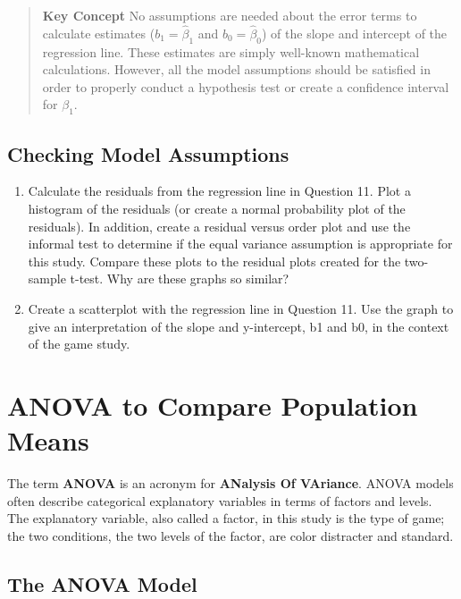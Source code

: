 \documentclass[
]{report}
\begin{document}
\begin{quote}
\textbf{Key Concept}
No assumptions are needed about the error terms to calculate estimates (\(b_1 = \hat{\beta}_1\) and \(b_0 = \hat{\beta}_0\)) of the slope and intercept of the regression line. These estimates are simply well-known mathematical calculations. However, all the model assumptions should be satisfied in order to properly conduct a hypothesis test or create a confidence interval for \(\beta_1\).
\end{quote}

\subsection*{Checking Model Assumptions}\label{checking-model-assumptions}

\begin{enumerate}
\def\labelenumi{\arabic{enumi}.}
\setcounter{enumi}{13}
\item
  Calculate the residuals from the regression line in Question 11. Plot a histogram of the residuals (or create a normal probability plot of the residuals). In addition, create a residual versus order plot and use the informal test to determine if the equal variance assumption is appropriate for this study. Compare these plots to the residual plots created for the two-sample t-test. Why are these graphs so similar?
\item
  Create a scatterplot with the regression line in Question 11. Use the graph to give an interpretation of the slope and y-intercept, b1 and b0, in the context of the game study.
\end{enumerate}

\newpage

\section{ANOVA to Compare Population Means}\label{anova-to-compare-population-means}

The term \textbf{ANOVA} is an acronym for \textbf{ANalysis Of VAriance}. ANOVA models often describe categorical explanatory variables in terms of factors and levels. The explanatory variable, also called a factor, in
this study is the type of game; the two conditions, the two levels of the factor, are color distracter and standard.

\subsection{The ANOVA Model}\label{the-anova-model}
\end{document}
